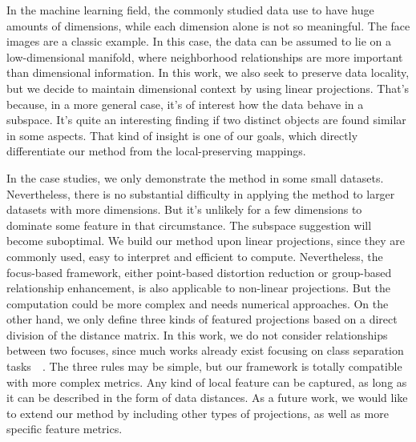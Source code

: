 In the machine learning field, the commonly studied data use to have huge amounts of dimensions, while each dimension alone is not so meaningful. The face images are a classic example. In this case, the data can be assumed to lie on a low-dimensional manifold, where neighborhood relationships are more important than dimensional information. In this work, we also seek to preserve data locality, but we decide to maintain dimensional context by using linear projections. That's because, in a more general case, it's of interest how the data behave in a subspace. It's quite an interesting finding if two distinct objects are found similar in some aspects. That kind of insight is one of our goals, which directly differentiate our method from the local-preserving mappings.

In the case studies, we only demonstrate the method in some small datasets. Nevertheless, there is no substantial difficulty in applying the method to larger datasets with more dimensions. But it's unlikely for a few dimensions to dominate some feature in that circumstance. The subspace suggestion will become suboptimal. We build our method upon linear projections, since they are commonly used, easy to interpret and efficient to compute. Nevertheless, the focus-based framework, either point-based distortion reduction or group-based relationship enhancement, is also applicable to non-linear projections. But the computation could be more complex and needs numerical approaches. On the other hand, we only define three kinds of featured projections based on a direct division of the distance matrix. In this work, we do not consider relationships between two focuses, since much works already exist focusing on class separation tasks~\cite{DBLP:conf/ieeevast/ChooLKP10}~\cite{DBLP:journals/cgf/SedlmairTMT12}. The three rules may be simple, but our framework is totally compatible with more complex metrics. Any kind of local feature can be captured, as long as it can be described in the form of data distances. As a future work, we would like to extend our method by including other types of projections, as well as more specific feature metrics.

